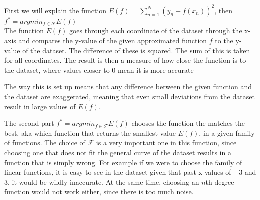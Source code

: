 First we will explain the function $E(f) = \sum_{n=1}^N(y_n-f(x_n))^2$, then $f^* = argmin_{f\in \mathcal{F}}E(f)$\\
The function $E(f)$ goes through each coordinate of the dataset through the x-axis and compares the y-value of the given approximated function $f$ to the y-value of the dataset. The difference of these is squared. The sum of this is taken for all coordinates. The result is then a measure of how close the function is to the dataset, where values closer to 0 mean it is more accurate

The way this is set up means that any difference between the given function and the dataset are exaggerated, meaning that even small deviations from the dataset result in large values of $E(f)$.

The second part $f^* = argmin_{f\in \mathcal{F}}E(f)$ chooses the function the matches the best, aka which function that returns the smallest value $E(f)$, in a given family of functions. The choice of $\mathcal{F}$ is a very important one in this function, since choosing one that does not fit the general curve of the dataset results in a function that is simply wrong. For example if we were to choose the family of linear functions, it is easy to see in the dataset given that past x-values of $-3$ and $3$, it would be wildly inaccurate. At the same time, choosing an $n$th degree function would not work either, since there is too much noise.